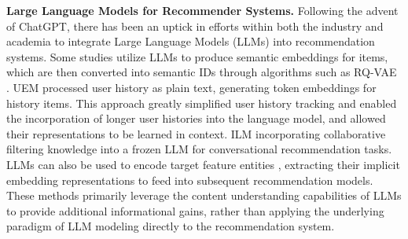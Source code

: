 \noindent \textbf{Large Language Models for Recommender Systems.} Following the advent of ChatGPT, there has been an uptick in efforts within both the industry and academia to integrate Large Language Models (LLMs) into recommendation systems. Some studies utilize LLMs to produce semantic embeddings for items, which are then converted into semantic IDs through algorithms such as RQ-VAE \cite{lee2022autoregressive, rajput2023recommender}. UEM \cite{doddapaneni2024user} processed user history as plain text, generating token embeddings for history items. This approach greatly simplified user history tracking and enabled the incorporation of longer user histories into the language model, and allowed their representations to be learned in context.
ILM \cite{yang2024item} incorporating collaborative filtering knowledge into a frozen LLM for conversational recommendation tasks.
LLMs can also be used to encode target feature entities \cite{chen2024hllm}, extracting their implicit embedding representations to feed into subsequent recommendation models. 
These methods primarily leverage the content understanding capabilities of LLMs to provide additional informational gains, rather than applying the underlying paradigm of LLM modeling directly to the recommendation system.